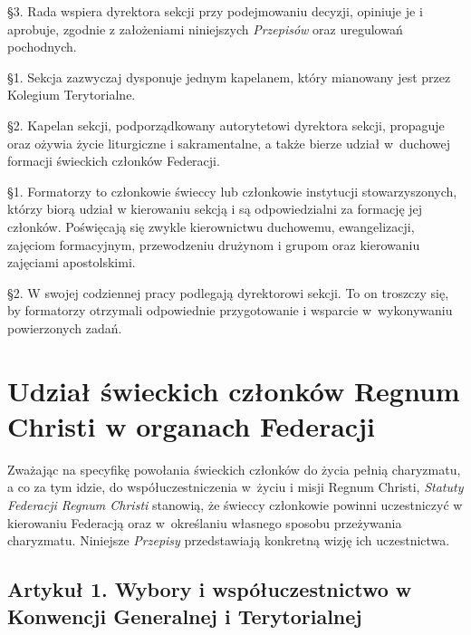 \S{}3. Rada wspiera dyrektora sekcji przy podejmowaniu decyzji, opiniuje je i aprobuje, zgodnie z założeniami niniejszych {\em Przepisów} oraz uregulowań pochodnych.


 \S{}1. Sekcja zazwyczaj dysponuje jednym kapelanem, który mianowany jest przez Kolegium Terytorialne.

\S{}2. Kapelan sekcji, podporządkowany autorytetowi dyrektora sekcji, propaguje oraz ożywia życie liturgiczne i sakramentalne, a także bierze udział \mbox{w duchowej} formacji świeckich członków Federacji.


 \S{}1. Formatorzy to członkowie świeccy lub członkowie instytucji stowarzyszonych, którzy biorą udział w kierowaniu sekcją i są odpowiedzialni za formację jej członków. Poświęcają się zwykle kierownictwu duchowemu, ewangelizacji, zajęciom formacyjnym, przewodzeniu drużynom i grupom oraz kierowaniu zajęciami apostolskimi.

\S{}2. W swojej codziennej pracy podlegają dyrektorowi sekcji. To on troszczy się, by formatorzy otrzymali odpowiednie przygotowanie i wsparcie \mbox{w wykonywaniu} powierzonych zadań.

\chapter{Udział świeckich członków Regnum Christi w organach Federacji}


 Zważając na specyfikę powołania świeckich członków do życia pełnią charyzmatu, a co za tym idzie, do współuczestniczenia \mbox{w życiu} i misji Regnum Christi, {\em Statuty Federacji Regnum Christi} stanowią, że świeccy członkowie powinni uczestniczyć w kierowaniu Federacją oraz \mbox{w określaniu} własnego sposobu przeżywania charyzmatu. Niniejsze {\em Przepisy} przedstawiają konkretną wizję ich uczestnictwa.


\section{Artykuł 1. Wybory i współuczestnictwo w Konwencji Generalnej i Terytorialnej}


